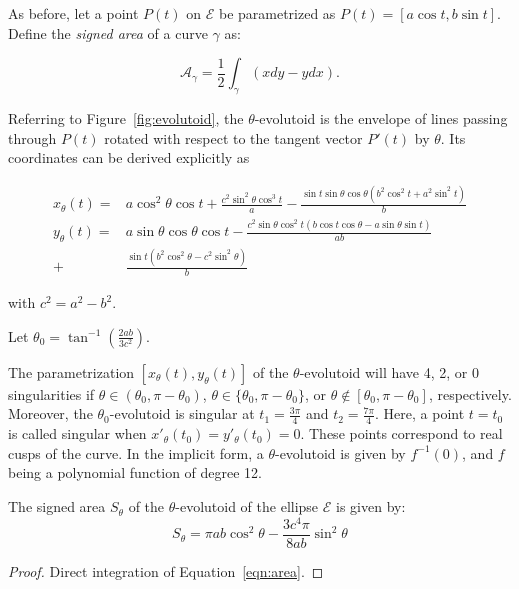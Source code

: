As before, let a point $P(t)$ on $\mathcal{E}$ be parametrized as $P(t)=[a\cos t,b\sin t]$. Define the {\em signed area} of a curve $\gamma$ as:

\begin{equation}
\mathcal{A}_\gamma=\frac{1}{2}\int_{\gamma}(x{dy}-y{dx}).
\label{eqn:area}
\end{equation}


Referring to Figure~\ref{fig:evolutoid}, the $\theta$-evolutoid is the envelope of lines passing through $P(t)$ rotated with respect to the tangent vector $P'(t)$ by $\theta$. Its coordinates can be derived explicitly as

\begin{align*}
x_{\theta}(t)=& a\cos^{2}{\theta}\cos{t}
  + \frac {c^2 \sin^2  \theta 
		\cos^3   t  
	 }{a} - \frac {\sin t \sin   \theta
	  \cos  \theta    (   b^2\cos^2 t
		 +{a}^{2}   \sin^2 t )}{b} 
 \\
y_{\theta}(t)=&a\sin   \theta
\cos  \theta  \cos   t - \frac {c^2\sin{\theta} \cos^{2}t \left( b\cos
		t \cos  \theta  -a\sin  \theta
	  \sin t \right) }{ab}  \\
  +& \frac {
		\sin t   \left( b^2\cos^2   \theta 
	  -c^2 \sin^2  \theta  
		 \right)}{b}
%
\end{align*}

\noindent with $c^2=a^2-b^2$.

Let $\theta_0=\tan^{-1}\left(\frac{2ab}{{3}c^2}\right)$.

\begin{remark}
 The parametrization $[x_\theta(t), y_\theta(t)]$ of the $\theta$-evolutoid will   have 4, 2, or 0 singularities if
$\theta\in(\theta_0,\pi-\theta_0)$, $\theta\in\{\theta_0,\pi-\theta_0\}$, or $\theta\notin[\theta_0,\pi-\theta_0]$, respectively. Moreover, the ${\theta_0}$-evolutoid is singular at $t_1=\frac{3\pi}{4}$ and
	$t_2=  \frac{7\pi}{4}$.
	Here, a  point $t=t_0$ is called singular when $x'_\theta(t_0)=y'_\theta(t_0)=0$.
	These points correspond to real cusps of the curve.  
	In the implicit form,   a  $\theta$-evolutoid is given by $f^{-1}(0)$, and $f$ being a polynomial   function of degree 12.
\end{remark}

\begin{proposition}
The signed area $S_\theta$ of the 
$\theta$-evolutoid  of the ellipse $\mathcal E$ is given by:
%
\[S_{\theta}=\pi a b \cos^2\theta -\frac{  3 c^4\pi}{8 ab} \sin^2\theta\]
\end{proposition}
\begin{proof}
Direct integration of Equation~\ref{eqn:area}.
\end{proof}

